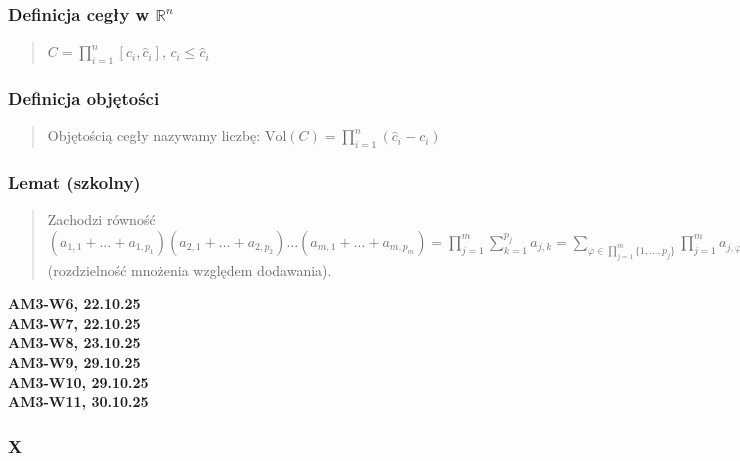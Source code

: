 \documentclass[10pt,a4paper]{article}
\newcommand{\zagadnienie}[3]{%
    \clearpage %
    \noindent\textbf{#1} #2\\
    #3
}
\begin{document}
{    \subsubsection*{Definicja cegły w $\mathbb{R}^n$}
    \begin{quote}
    $C = \prod_{i=1}^n [c_i, \hat{c}_i]$, $c_i \le \hat{c}_i$
    \end{quote}

    \subsubsection*{Definicja objętości}
    \begin{quote}
    Objętością cegły nazywamy liczbę:
    $\mathrm{Vol}(C) = \prod_{i=1}^n (\hat{c}_i - c_i)$
    
\end{quote}
    \subsubsection*{Lemat (szkolny)}
    \begin{quote}
    Zachodzi równość \\
    $(a_{1,1} + \dots + a_{1, p_1})(a_{2,1} + \dots + a_{2, p_2})\dots(a_{m,1} + \dots + a_{m, p_m}) = \prod_{j=1}^m \sum_{k=1}^{p_j} a_{j,k} = \sum_{\varphi \in \prod_{j=1}^m \{1, \dots, p_j\}} \prod_{j=1}^m a_{j, \varphi(j)}$ \\
    (rozdzielność mnożenia względem dodawania).
    \end{quote}

}

\zagadnienie{AM3-W6, 22.10.25}{}
{

}
\zagadnienie{AM3-W7, 22.10.25}{}
{
}

\zagadnienie{AM3-W8, 23.10.25}{}
{
}

\zagadnienie{AM3-W9, 29.10.25}{}
{
}

\zagadnienie{AM3-W10, 29.10.25}{}
{
}

\zagadnienie{AM3-W11, 30.10.25}{}
{
    \begin{tcolorbox}[mybox]
    \subsubsection*{X}
    \begin{quote}
    \end{quote}
    \end{tcolorbox}
}
\end{document}
